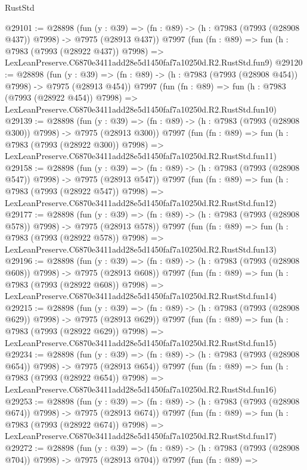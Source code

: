 \begin{lexlean}{RustStd}
\begin{coremodule}
@29101 := @28898
    (fun (y : @39) => (fn : @89) -> (h : @7983 (@7993 (@28908 @437)) @7998) -> @7975 (@28913 @437))
    @7997
    (fun (fn : @89) =>
    fun (h : @7983 (@7993 (@28922 @437)) @7998) =>
    LexLeanPreserve.C6870e3411add28e5d1450faf7a10250d.R2.RustStd.fun9)
@29120 := @28898
    (fun (y : @39) => (fn : @89) -> (h : @7983 (@7993 (@28908 @454)) @7998) -> @7975 (@28913 @454))
    @7997
    (fun (fn : @89) =>
    fun (h : @7983 (@7993 (@28922 @454)) @7998) =>
    LexLeanPreserve.C6870e3411add28e5d1450faf7a10250d.R2.RustStd.fun10)
@29139 := @28898
    (fun (y : @39) => (fn : @89) -> (h : @7983 (@7993 (@28908 @300)) @7998) -> @7975 (@28913 @300))
    @7997
    (fun (fn : @89) =>
    fun (h : @7983 (@7993 (@28922 @300)) @7998) =>
    LexLeanPreserve.C6870e3411add28e5d1450faf7a10250d.R2.RustStd.fun11)
@29158 := @28898
    (fun (y : @39) => (fn : @89) -> (h : @7983 (@7993 (@28908 @547)) @7998) -> @7975 (@28913 @547))
    @7997
    (fun (fn : @89) =>
    fun (h : @7983 (@7993 (@28922 @547)) @7998) =>
    LexLeanPreserve.C6870e3411add28e5d1450faf7a10250d.R2.RustStd.fun12)
@29177 := @28898
    (fun (y : @39) => (fn : @89) -> (h : @7983 (@7993 (@28908 @578)) @7998) -> @7975 (@28913 @578))
    @7997
    (fun (fn : @89) =>
    fun (h : @7983 (@7993 (@28922 @578)) @7998) =>
    LexLeanPreserve.C6870e3411add28e5d1450faf7a10250d.R2.RustStd.fun13)
@29196 := @28898
    (fun (y : @39) => (fn : @89) -> (h : @7983 (@7993 (@28908 @608)) @7998) -> @7975 (@28913 @608))
    @7997
    (fun (fn : @89) =>
    fun (h : @7983 (@7993 (@28922 @608)) @7998) =>
    LexLeanPreserve.C6870e3411add28e5d1450faf7a10250d.R2.RustStd.fun14)
@29215 := @28898
    (fun (y : @39) => (fn : @89) -> (h : @7983 (@7993 (@28908 @629)) @7998) -> @7975 (@28913 @629))
    @7997
    (fun (fn : @89) =>
    fun (h : @7983 (@7993 (@28922 @629)) @7998) =>
    LexLeanPreserve.C6870e3411add28e5d1450faf7a10250d.R2.RustStd.fun15)
@29234 := @28898
    (fun (y : @39) => (fn : @89) -> (h : @7983 (@7993 (@28908 @654)) @7998) -> @7975 (@28913 @654))
    @7997
    (fun (fn : @89) =>
    fun (h : @7983 (@7993 (@28922 @654)) @7998) =>
    LexLeanPreserve.C6870e3411add28e5d1450faf7a10250d.R2.RustStd.fun16)
@29253 := @28898
    (fun (y : @39) => (fn : @89) -> (h : @7983 (@7993 (@28908 @674)) @7998) -> @7975 (@28913 @674))
    @7997
    (fun (fn : @89) =>
    fun (h : @7983 (@7993 (@28922 @674)) @7998) =>
    LexLeanPreserve.C6870e3411add28e5d1450faf7a10250d.R2.RustStd.fun17)
@29272 := @28898
    (fun (y : @39) => (fn : @89) -> (h : @7983 (@7993 (@28908 @704)) @7998) -> @7975 (@28913 @704))
    @7997
    (fun (fn : @89) =>

\end{coremodule}
\end{lexlean}
